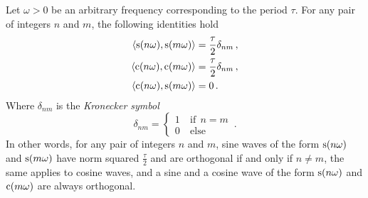 \begin{theorem}
  \label{thm:sc-orth}
  Let $\omega>0$ be an arbitrary frequency corresponding to the period $\tau$. For any pair
  of integers $n$ and $m$, the following identities hold
  \begin{align}
    \braket{\operatorname{s}(n\omega),\operatorname{s}(m\omega)}&=\frac{\tau}{2}\delta_{nm}\,,\label{eq:sw-orth}\\
    \braket{\operatorname{c}(n\omega),\operatorname{c}(m\omega)}&=\frac{\tau}{2}\delta_{nm}\,,\label{eq:cw-orth}\\
    \braket{\operatorname{c}(n\omega),\operatorname{s}(m\omega)}&=0\,.\label{eq:scw-orth}
  \end{align}
  Where $\delta_{nm}$ is the \emph{Kronecker symbol}
  \begin{equation}
    \delta_{nm}=
    \begin{cases}
      1&~\mathrm{if}~~n=m\\
      0&~\mathrm{else}
    \end{cases}\,.
  \end{equation}
  In other words, for any pair of integers $n$ and $m$, sine waves of the form
  $\operatorname{s}(n\omega)$ and $\operatorname{s}(m\omega)$ have norm squared $\frac{\tau}{2}$ and are orthogonal if
  and only if $n\neq m$, the same applies to cosine waves, and a sine and a cosine wave of
  the form $\operatorname{s}(n\omega)$ and $\operatorname{c}(m\omega)$ are always orthogonal.
\end{theorem}
